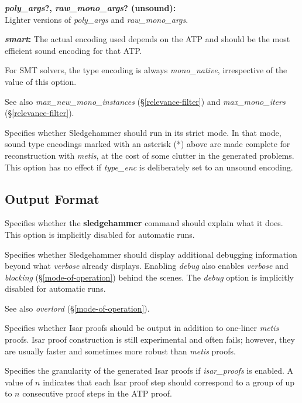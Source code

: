 \documentclass[a4paper,12pt]{article}
\begin{document}
\begin{enum}
\begin{enum}
\item[\labelitemi] \textbf{\textit{poly\_args}?, \textit{raw\_mono\_args}? (unsound):} \\
Lighter versions of \textit{poly\_args} and \textit{raw\_mono\_args}.

\item[\labelitemi] \textbf{\textit{smart}:} The actual encoding used depends on
the ATP and should be the most efficient sound encoding for that ATP.
\end{enum}

For SMT solvers, the type encoding is always \textit{mono\_native}, irrespective
of the value of this option.

\nopagebreak
{\small See also \textit{max\_new\_mono\_instances} (\S\ref{relevance-filter})
and \textit{max\_mono\_iters} (\S\ref{relevance-filter}).}

Specifies whether Sledgehammer should run in its strict mode. In that mode,
sound type encodings marked with an asterisk (*) above are made complete
for reconstruction with \textit{metis}, at the cost of some clutter in the
generated problems. This option has no effect if \textit{type\_enc} is
deliberately set to an unsound encoding.
\end{enum}

\subsection{Output Format}
\label{output-format}

\begin{enum}

Specifies whether the \textbf{sledgehammer} command should explain what it does.
This option is implicitly disabled for automatic runs.

Specifies whether Sledgehammer should display additional debugging information
beyond what \textit{verbose} already displays. Enabling \textit{debug} also
enables \textit{verbose} and \textit{blocking} (\S\ref{mode-of-operation})
behind the scenes. The \textit{debug} option is implicitly disabled for
automatic runs.

\nopagebreak
{\small See also \textit{overlord} (\S\ref{mode-of-operation}).}

Specifies whether Isar proofs should be output in addition to one-liner
\textit{metis} proofs. Isar proof construction is still experimental and often
fails; however, they are usually faster and sometimes more robust than
\textit{metis} proofs.

Specifies the granularity of the generated Isar proofs if \textit{isar\_proofs}
is enabled. A value of $n$ indicates that each Isar proof step should correspond
to a group of up to $n$ consecutive proof steps in the ATP proof.
\end{enum}
\end{document}
